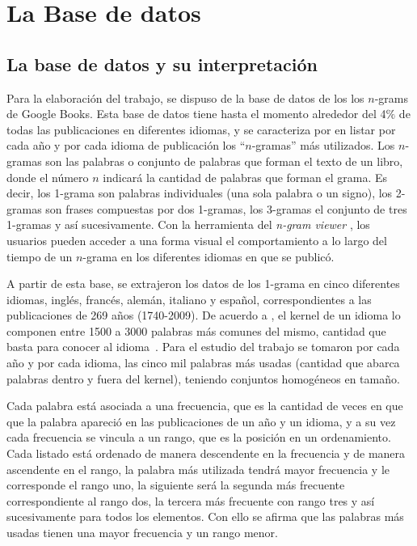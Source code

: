\chapter{La Base de datos}


\section{La base de datos y su interpretación} %

Para la elaboración del trabajo,  se dispuso de la base de datos de los los
$n$-grams de Google Books. Esta base de datos
tiene hasta el momento alrededor del 4$\%$ de todas las publicaciones en
diferentes idiomas,  y se caracteriza por en listar  por cada año y por cada
idioma de publicación los ``$n$-gramas''  más utilizados.   Los $n$-gramas son
las palabras o conjunto de palabras que forman el texto de un libro, donde el
número $n$ indicará la cantidad de palabras que forman el grama.  Es decir, los
1-grama son palabras individuales (una sola palabra o un signo), los 2-gramas
son frases compuestas por dos 1-gramas, los 3-gramas el conjunto de tres 1-gramas
y así sucesivamente.   Con la herramienta del \textit{n-gram viewer}
\cite{ngramv}, los usuarios pueden acceder a una forma visual el comportamiento
a lo largo del tiempo de un $n$-grama en los diferentes idiomas en que se
publicó.  

A partir de esta base, se extrajeron los datos de los 1-grama en cinco
diferentes idiomas, inglés, francés, alemán, italiano y español,
correspondientes a las publicaciones de 269 años (1740-2009).  De acuerdo a
\cite{iplosone},  el kernel de un idioma lo componen entre 1500 a 3000 palabras
más comunes del mismo,  cantidad que basta para conocer al idioma~.  Para el
estudio del trabajo se tomaron por cada año y por cada idioma,  las cinco mil
palabras más usadas (cantidad que abarca palabras dentro y fuera del kernel),
teniendo conjuntos homogéneos en tamaño.

Cada palabra está asociada a una frecuencia, que es la cantidad de veces en que
que la  palabra apareció en las publicaciones de un año y un idioma, y a su vez
cada frecuencia se vincula a un rango, que es la posición en un ordenamiento.
Cada listado está ordenado de manera descendente en la frecuencia y de manera
ascendente en el rango, la palabra más utilizada tendrá mayor frecuencia y le
corresponde el rango uno,  la siguiente será la segunda más frecuente
correspondiente al rango dos,  la tercera más frecuente con rango tres y así
sucesivamente para todos los elementos.  Con ello se afirma que las palabras
más usadas tienen una mayor frecuencia y un rango menor. 

